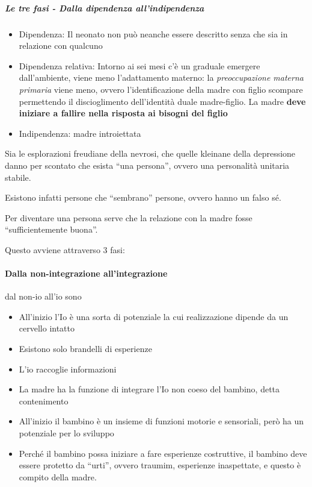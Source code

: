 \documentclass[12pt, a4paper]{article}
\begin{document}
\subparagraph{Le tre fasi - Dalla dipendenza all'indipendenza}

\begin{itemize}
    \item Dipendenza: Il neonato non può neanche essere descritto senza che sia in relazione con qualcuno
    \item Dipendenza relativa: Intorno ai sei mesi c'\`e un graduale emergere dall'ambiente, viene meno l'adattamento materno: la \emph{preoccupazione materna primaria} viene meno, ovvero l'identificazione della madre con figlio scompare permettendo il discioglimento dell'identit\`a duale madre-figlio. La madre \textbf{deve iniziare a fallire nella risposta ai bisogni del figlio}
    \item Indipendenza: madre introiettata
\end{itemize}

Sia le esplorazioni freudiane della nevrosi, che quelle kleinane della depressione danno per scontato che esista ``una persona'', ovvero una personalit\`a unitaria stabile.

Esistono infatti persone che ``sembrano'' persone, ovvero hanno un falso s\'e.

Per diventare una persona serve che la relazione con la madre fosse ``sufficientemente buona''.

Questo avviene attraverso 3 fasi:

\paragraph{Dalla non-integrazione all'integrazione} dal non-io all'io sono
\begin{itemize}
    \item All'inizio l'Io \`e una sorta di potenziale la cui realizzazione dipende da un cervello intatto
    \item Esistono solo brandelli di esperienze
    \item L'io raccoglie informazioni
    \item La madre ha la funzione di integrare l'Io non coeso del bambino, detta contenimento
    \item All'inizio il bambino \`e un insieme di funzioni motorie e sensoriali, però ha un potenziale per lo sviluppo
    \item Perch\'e il bambino possa iniziare a fare esperienze costruttive, il bambino deve essere protetto da ``urti'', ovvero traumim, esperienze inaspettate, e questo \`e compito della madre.
\end{itemize}
\end{document}
